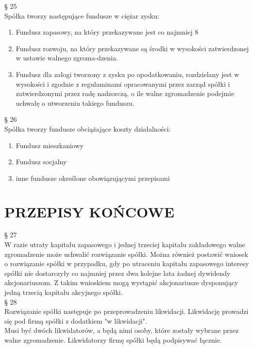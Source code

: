 \documentclass[a4paper, 11pt]{article}
\begin{document}
§ 25\\

Spółka tworzy następujące fundusze w ciężar zysku:
\begin{enumerate}
\item	Fundusz zapasowy, na który przekazywane jest co najmniej 8%
\item	Fundusz rozwoju, na który przekazywane są środki w wysokości zatwierdzonej w ustawie walnego zgroma-dzenia.
\item	Fundusz dla załogi tworzony z zysku po opodatkowaniu, rozdzielany jest w wysokości i zgodnie z regulaminami opracowanymi przez zarząd spółki i zatwierdzonymi przez radę nadzorczą, o ile walne zgromadzenie podejmie uchwałę o utworzeniu takiego funduszu.

\end{enumerate}

§ 26\\

Spółka tworzy fundusze obciążające koszty działalności:
\begin{enumerate}
\item	Fundusz mieszkaniowy
\item	Fundusz socjalny
\item	inne fundusze określone obowiązującymi przepisami
\end{enumerate}


\section{PRZEPISY KOŃCOWE}
 
	 § 27\\

W razie utraty kapitału zapasowego i jednej trzeciej kapitału zakładowego walne zgromadzenie może uchwalić rozwiązanie spółki. Można również postawić wniosek o rozwiązanie spółki w przypadku, gdy po utraceniu kapitału zapasowego interesy spółki nie dostarczyły co najmniej przez dwa kolejne lata żadnej dywidendy akcjonariuszom. Z takim wnioskiem mogą wystąpić akcjonariusze dysponujący jedną trzecią kapitału akcyjnego spółki.\\ 

§ 28\\

Rozwiązanie spółki następuje po przeprowadzeniu likwidacji. Likwidację prowadzi się pod firmą spółki z dodatkiem "w likwidacji".\\
Musi być dwóch likwidatorów, a będą nimi osoby, które zostały wybrane przez walne zgromadzenie. Likwidatorzy firmę spółki będą podpisywać łącznie.\\ 
\end{document}
